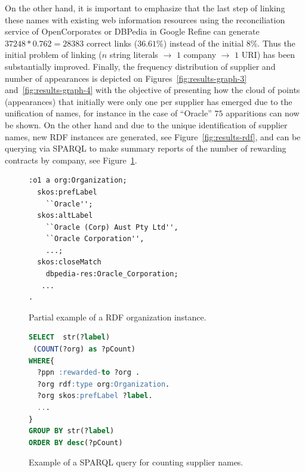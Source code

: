 \documentclass{llncs}
\begin{document}
On the other hand, it is important to emphasize that the last step of linking these names 
with existing web information resources using the reconciliation service of OpenCorporates or DBPedia in Google Refine can generate 
$37248*0.762=28383$ correct links ($36.61$\%) instead of the initial $8$\%. Thus the initial problem of linking ($n$ string literals $\to$ 
$1$ company $\to$ $1$ URI) has been substantially improved. Finally, the frequency distribution of supplier and number of appearances is depicted on Figures~\ref{fig:results-graph-3}
and~\ref{fig:results-graph-4} with the objective of presenting how the cloud of points (appearances) that initially were only one per supplier has 
emerged due to the unification of names, for instance in the case of ``Oracle'' $75$ apparitions can now be shown. On the other hand and due 
to the unique identification of supplier names, new RDF instances are generated, see Figure~\ref{fig:results-rdf}, and can be querying via SPARQL to make 
summary reports of the number of rewarding contracts by company, see Figure~\ref{fig:results-sparql}.


\begin{figure}[ht]
\begin{minipage}[b]{0.45\linewidth}
\begin{lstlisting}[language=XML]  
:o1 a org:Organization;
  skos:prefLabel 
    ``Oracle'';
  skos:altLabel 
    ``Oracle (Corp) Aust Pty Ltd'', 
    ``Oracle Corporation'', 
    ...;
  skos:closeMatch 
    dbpedia-res:Oracle_Corporation;
   ...
.
\end{lstlisting}
\caption{Partial example of a RDF organization instance. }
 \label{fig:results-rdf}
\end{minipage}
\hspace{0.5cm}
\begin{minipage}[b]{0.45\linewidth}
\begin{lstlisting}[language=SQL]  
SELECT  str(?label) 
 (COUNT(?org) as ?pCount)
WHERE{
  ?ppn :rewarded-to ?org .
  ?org rdf:type org:Organization.
  ?org skos:prefLabel ?label.
  ...
}
GROUP BY str(?label) 
ORDER BY desc(?pCount)
\end{lstlisting}
\caption{Example of a SPARQL query for counting supplier names. }
 \label{fig:results-sparql}
\end{minipage}
\end{figure}
\end{document}
